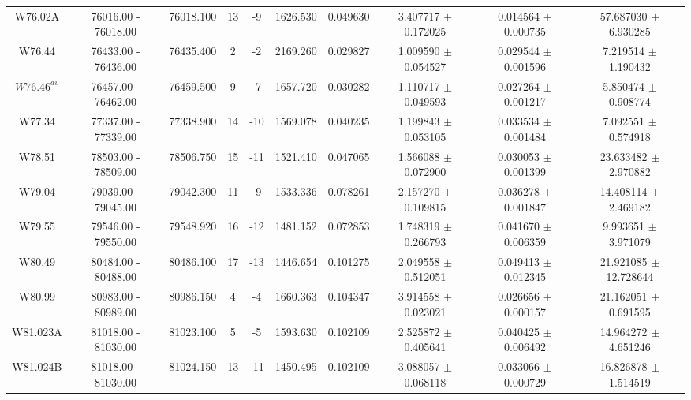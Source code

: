 \documentclass{article}
\begin{document}
\begin{table}[h]
{\begin{tabular}{|c|c|c|c|c|c|c|c|c|c|}
W76.02A & 76016.00 - 76018.00 & 76018.100 & 13 & -9 & 1626.530 & 0.049630 & 3.407717 $\pm$ 0.172025 & 0.014564 $\pm$ 0.000735 & 57.687030 $\pm$ 6.930285 \\

W76.44 & 76433.00 - 76436.00 & 76435.400 & 2 & -2 & 2169.260 & 0.029827 & 1.009590 $\pm$ 0.054527 & 0.029544 $\pm$ 0.001596 & 7.219514 $\pm$ 1.190432 \\
    
$W76.46^{av}$ & 76457.00 - 76462.00 & 76459.500 & 9 & -7 & 1657.720 & 0.030282 & 1.110717 $\pm$ 0.049593 & 0.027264 $\pm$ 0.001217 & 5.850474 $\pm$ 0.908774 \\
         
W77.34 & 77337.00 - 77339.00 & 77338.900 & 14 & -10 & 1569.078 & 0.040235 & 1.199843 $\pm$ 0.053105 & 0.033534 $\pm$ 0.001484 & 7.092551 $\pm$ 0.574918 \\

W78.51 & 78503.00 - 78509.00 & 78506.750 & 15 & -11 & 1521.410 & 0.047065 & 1.566088 $\pm$ 0.072900 & 0.030053 $\pm$ 0.001399 & 23.633482 $\pm$ 2.970882 \\

W79.04 & 79039.00 - 79045.00 & 79042.300 & 11 & -9 & 1533.336 & 0.078261 & 2.157270 $\pm$ 0.109815 & 0.036278 $\pm$ 0.001847 & 14.408114 $\pm$ 2.469182 \\
         
W79.55 & 79546.00 - 79550.00 & 79548.920 & 16 & -12 & 1481.152 & 0.072853 & 1.748319 $\pm$ 0.266793 &  0.041670 $\pm$ 0.006359 & 9.993651 $\pm$ 3.971079 \\
         
W80.49 & 80484.00 - 80488.00 & 80486.100 & 17 & -13 & 1446.654 & 0.101275 & 2.049558 $\pm$ 0.512051 & 0.049413 $\pm$ 0.012345 & 21.921085 $\pm$ 12.728644 \\

W80.99 & 80983.00 - 80989.00 & 80986.150 & 4 & -4 & 1660.363 & 0.104347 & 3.914558 $\pm$ 0.023021 & 0.026656 $\pm$ 0.000157 & 21.162051 $\pm$ 0.691595 \\

W81.023A & 81018.00 - 81030.00 & 81023.100 & 5 & -5 & 1593.630 & 0.102109 & 2.525872 $\pm$ 0.405641 & 0.040425 $\pm$ 0.006492 & 14.964272 $\pm$ 4.651246 \\

W81.024B & 81018.00 - 81030.00 & 81024.150 & 13 & -11 & 1450.495 & 0.102109 & 3.088057 $\pm$ 0.068118 & 0.033066 $\pm$ 0.000729 & 16.826878 $\pm$ 1.514519 \\


\end{tabular}}
\end{table}
\end{document}
